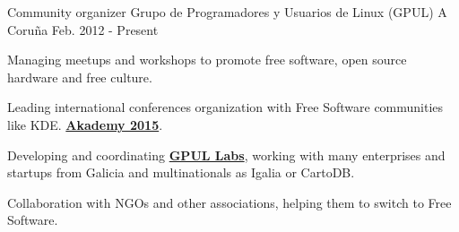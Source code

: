 


\begin{cventries}


\cventry
{Community organizer} %
{Grupo de Programadores y Usuarios de Linux (GPUL)} %
{A Coruña} %
{Feb. 2012 - Present} %
{ %
\begin{cvitems}
\item {Managing meetups and workshops to promote free software, open 
source hardware and free culture.}
\item {Leading international conferences organization with Free Software 
communities like KDE. \textbf{\href{https://akademy.kde.org/2015}{Akademy 
2015}}.}
\item {Developing and coordinating 
\textbf{\href{http://labs.gpul.org/}{GPUL Labs}}, working with many enterprises 
and startups from Galicia and multinationals as Igalia or CartoDB.}
\item {Collaboration with NGOs and other associations, helping them to switch to
Free Software.}
\end{cvitems}
}



\end{cventries}
